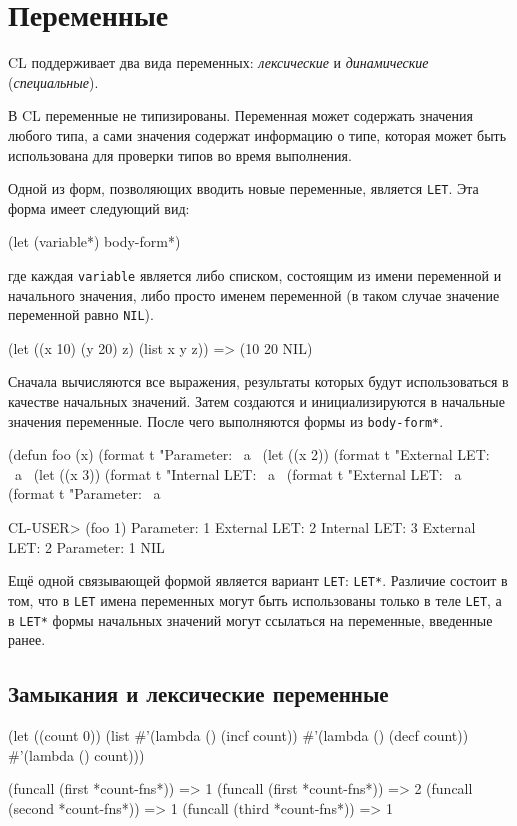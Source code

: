 \section{Переменные}
CL поддерживает два вида переменных: \emph{лексические} и \emph{динамические} (\emph{специальные}).

В CL переменные не типизированы. Переменная может содержать значения любого типа, а сами значения содержат информацию о типе, которая может быть использована для проверки типов во время выполнения.

Одной из форм, позволяющих вводить новые переменные, является \lstinline{LET}. Эта форма имеет следующий вид:
\begin{cllst}{}{}
(let (variable*)
  body-form*)
\end{cllst}
где каждая \lstinline{variable} является либо списком, состоящим из имени переменной и начального значения, либо просто именем переменной (в таком случае значение переменной равно \lstinline{NIL}).
\begin{cllst}{}{}
(let ((x 10) (y 20) z)
  (list x y z))         => (10 20 NIL)
\end{cllst}

Сначала вычисляются все выражения, результаты которых будут использоваться в качестве начальных значений. Затем создаются и инициализируются в начальные значения переменные. После чего выполняются формы из \lstinline{body-form*}.
\begin{cllst}{}{}
(defun foo (x)
  (format t "Parameter: ~a~%
  (let ((x 2))
    (format t "External LET: ~a~%
    (let ((x 3))
      (format t "Internal LET: ~a~%
    (format t "External LET: ~a~%
  (format t "Parameter: ~a~%

CL-USER> (foo 1)
Parameter: 1
External LET: 2
Internal LET: 3
External LET: 2
Parameter: 1
NIL
\end{cllst}

Ещё одной связывающей формой является вариант \lstinline{LET}: \lstinline{LET*}. Различие состоит в том, что в \lstinline{LET} имена переменных могут быть использованы только в теле \lstinline{LET}, а в \lstinline{LET*} формы начальных значений могут ссылаться на переменные, введенные ранее.

\subsection{Замыкания и лексические переменные}

\begin{cllst}{}{}
(let ((count 0))
  (list
   #'(lambda () (incf count))
   #'(lambda () (decf count))
   #'(lambda () count)))


(funcall (first *count-fns*))  => 1
(funcall (first *count-fns*))  => 2
(funcall (second *count-fns*)) => 1
(funcall (third *count-fns*))  => 1
\end{cllst}

